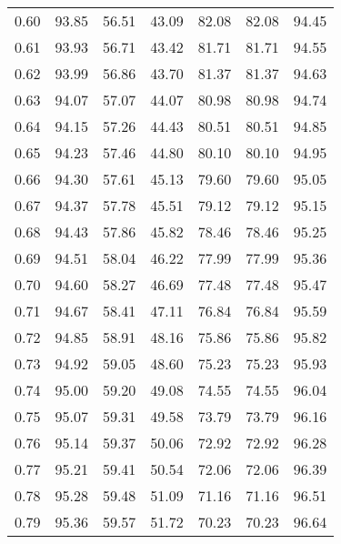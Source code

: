 \begin{tabular}{|c|c|c|c|c|c|c|}
      0.60 &     93.85 &     56.51 &      43.09 &   82.08 &      82.08 &         94.45 \\
      0.61 &     93.93 &     56.71 &      43.42 &   81.71 &      81.71 &         94.55 \\
      0.62 &     93.99 &     56.86 &      43.70 &   81.37 &      81.37 &         94.63 \\
      0.63 &     94.07 &     57.07 &      44.07 &   80.98 &      80.98 &         94.74 \\
      0.64 &     94.15 &     57.26 &      44.43 &   80.51 &      80.51 &         94.85 \\
      0.65 &     94.23 &     57.46 &      44.80 &   80.10 &      80.10 &         94.95 \\
      0.66 &     94.30 &     57.61 &      45.13 &   79.60 &      79.60 &         95.05 \\
      0.67 &     94.37 &     57.78 &      45.51 &   79.12 &      79.12 &         95.15 \\
      0.68 &     94.43 &     57.86 &      45.82 &   78.46 &      78.46 &         95.25 \\
      0.69 &     94.51 &     58.04 &      46.22 &   77.99 &      77.99 &         95.36 \\
      0.70 &     94.60 &     58.27 &      46.69 &   77.48 &      77.48 &         95.47 \\
      0.71 &     94.67 &     58.41 &      47.11 &   76.84 &      76.84 &         95.59 \\
      0.72 &     94.85 &     58.91 &      48.16 &   75.86 &      75.86 &         95.82 \\
      0.73 &     94.92 &     59.05 &      48.60 &   75.23 &      75.23 &         95.93 \\
      0.74 &     95.00 &     59.20 &      49.08 &   74.55 &      74.55 &         96.04 \\
      0.75 &     95.07 &     59.31 &      49.58 &   73.79 &      73.79 &         96.16 \\
      0.76 &     95.14 &     59.37 &      50.06 &   72.92 &      72.92 &         96.28 \\
      0.77 &     95.21 &     59.41 &      50.54 &   72.06 &      72.06 &         96.39 \\
      0.78 &     95.28 &     59.48 &      51.09 &   71.16 &      71.16 &         96.51 \\
      0.79 &     95.36 &     59.57 &      51.72 &   70.23 &      70.23 &         96.64 \\

\end{tabular}
